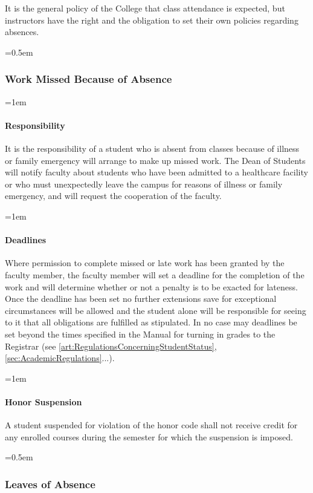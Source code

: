 \documentclass{manual}
\let\oldsubsubsection\subsubsection
\renewcommand\subsubsection{\leftskip=0.5em\oldsubsubsection}
\let\oldparagraph\paragraph
\renewcommand\paragraph{\leftskip=1em\oldparagraph}
\begin{document}
It is the general policy of the College that class attendance is expected, but instructors have the right and the obligation to set their own policies regarding absences.

\subsubsection{Work Missed Because of Absence}

\paragraph{Responsibility}
It is the responsibility of a student who is absent from classes because of illness or family emergency will arrange to make up missed work. The Dean of Students will notify faculty about students who have been admitted to a healthcare facility or who must unexpectedly leave the campus for reasons of illness or family emergency, and will request the cooperation of the faculty.

\paragraph{Deadlines}
Where permission to complete missed or late work has been granted by the faculty member, the faculty member will set a deadline for the completion of the work and will determine whether or not a penalty is to be exacted for lateness. Once the deadline has been set no further extensions save for exceptional circumstances will be allowed and the student alone will be responsible for seeing to it that all obligations are fulfilled as stipulated. In no case may deadlines be set beyond the times specified in the Manual for turning in grades to the Registrar (see \cref{art:RegulationsConcerningStudentStatus}, \cref{sec:AcademicRegulations}...).

\paragraph{Honor Suspension}
A student suspended for violation of the honor code shall not receive credit for any enrolled courses during the semester for which the suspension is imposed.

\subsubsection{Leaves of Absence}
\end{document}
